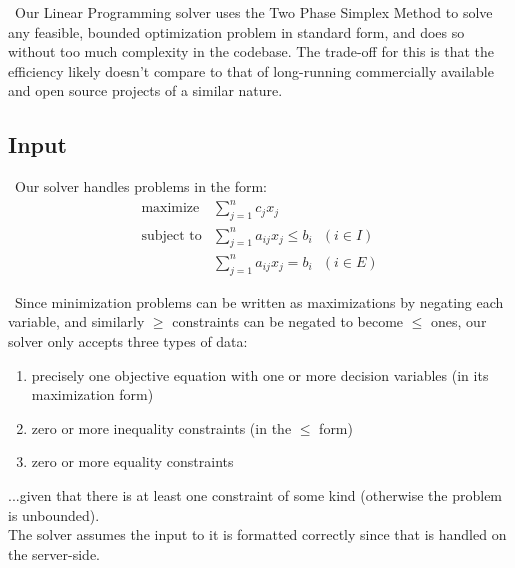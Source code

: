 \documentclass[11pt]{article}
\begin{document}
~\indent Our Linear Programming solver uses the Two Phase 
Simplex Method \cite{chvatal83} to solve any feasible, bounded optimization problem in standard form, and does so without too much complexity in the codebase. The trade-off for this is that the efficiency likely doesn't compare to that of long-running commercially available and open source projects of a similar nature.
    \subsection{Input}
~\indent Our solver handles problems in the form:
\begin{eqnarray*}
\mbox{maximize}& \sum\limits_{j=1}^n c_jx_j\\
\mbox{subject to}& \sum\limits_{j=1}^n a_{ij}x_j \leq b_i\mbox{\ \ }(i \in I)\\
& \sum\limits_{j=1}^n a_{ij}x_j = b_i\mbox{\ \ }(i \in E)
\end{eqnarray*}

~\indent Since minimization problems can be written as maximizations by negating each variable, and similarly $\geq$ constraints can be negated to become $\leq$ ones, our solver only accepts three types of data:
\begin{enumerate}
\item precisely one objective equation with one or more decision variables (in its maximization form)
\item zero or more inequality constraints (in the $\leq$ form)
\item zero or more equality constraints
\end{enumerate}
...given that there is at least one constraint of some kind (otherwise the problem is unbounded).\\
The solver assumes the input to it is formatted correctly since that is handled on the server-side.
\end{document}
